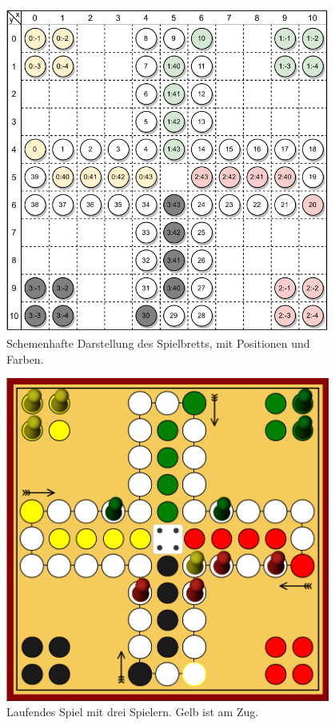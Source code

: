\begin{figure}[h]
\centering
\includegraphics[width=0.95\textwidth]{bilder/PDF_SVG/MAEDN_BOARD_DIAGRAM.pdf}
\caption{Schemenhafte Darstellung des Spielbretts, mit Positionen und Farben.}
\label{fig:maednbrett}
\end{figure}

\vspace{6pt}
\begin{figure}[h]
\centering
\includegraphics[width=0.95\textwidth]{bilder/game-in-progress.png}
\caption{Laufendes Spiel mit drei Spielern. Gelb ist am Zug.}
\label{fig:maedngame}
\end{figure}
